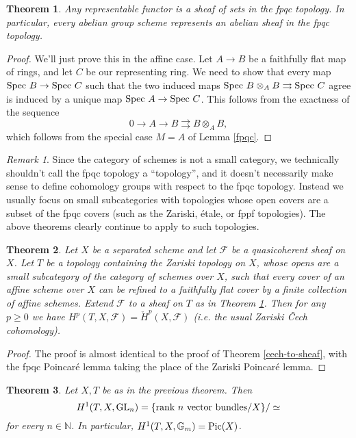 \documentclass[letterpaper,11pt]{article}
\newtheorem{thm}{Theorem}
\theoremstyle{definition}
\theoremstyle{remark}
\newtheorem{rmk}{Remark}
\begin{document}
\begin{thm}\label{qcoh-fpqc} Any representable functor is a sheaf of sets in the fpqc topology. In particular, every abelian group scheme represents an abelian sheaf in the fpqc topology.
\end{thm}
\begin{proof} We'll just prove this in the affine case. Let $A\rightarrow B$ be a faithfully flat map of rings, and let $C$ be our representing ring. We need to show that every map $\mbox{\rm Spec }B\rightarrow \mbox{\rm Spec }C$ such that the two induced maps $\mbox{\rm Spec }B\otimes_AB \rightrightarrows\mbox{\rm Spec }C$ agree is induced by a unique map $\mbox{\rm Spec }A\rightarrow\mbox{\rm Spec }C$. This follows from the exactness of the sequence
\[
0 \rightarrow A \rightarrow B \rightrightarrows B\otimes_AB,
\]
which follows from the special case $M=A$ of Lemma \ref{fpqc}.
\end{proof}

\begin{rmk} Since the category of schemes is not a small category, we technically shouldn't call the fpqc topology a ``topology'', and it doesn't necessarily make sense to define cohomology groups with respect to the fpqc topology. Instead we usually focus on small subcategories with topologies whose open covers are a subset of the fpqc covers (such as the Zariski, \'{e}tale, or fppf topologies). The above theorems clearly continue to apply to such topologies.
\end{rmk}

\begin{thm} Let $X$ be a separated scheme and let $\mathcal{F}$ be a quasicoherent sheaf on $X$. Let $T$ be a topology containing the Zariski topology on $X$, whose opens are a small subcategory of the category of schemes over $X$, such that every cover of an affine scheme over $X$ can be refined to a faithfully flat cover by a finite collection of affine schemes. Extend $\mathcal{F}$ to a sheaf on $T$ as in Theorem \ref{qcoh-fpqc}. Then for any $p \ge 0$ we have $H^p(T,X,\mathcal{F}) = \check{H}^p(X,\mathcal{F})$ (i.e. the usual Zariski \v{C}ech cohomology).
\end{thm}
\begin{proof} The proof is almost identical to the proof of Theorem \ref{cech-to-sheaf}, with the fpqc Poincar\'{e} lemma taking the place of the Zariski Poincar\'{e} lemma.
\end{proof}

\begin{thm} Let $X,T$ be as in the previous theorem. Then
\[
H^1(T,X,\mbox{\rm GL}_n) = \{\mbox{\rm rank }n\mbox{\rm{ vector bundles}}/X\}/\simeq
\]
for every $n\in \mathbb{N}$. In particular, $H^1(T,X,\mathbb{G}_m) = \mbox{\rm Pic}(X)$.
\end{thm}



\end{document}
